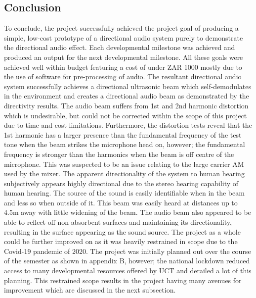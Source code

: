 \subsection{Conclusion}
To conclude, the project successfully achieved the project goal of producing a simple, low-cost prototype of a directional audio system purely to demonstrate the directional audio effect. Each developmental milestone was achieved and produced an output for the next developmental milestone. All these goals were achieved well within budget featuring a cost of under ZAR 1000 mostly due to the use of software for pre-processing of audio. The resultant directional audio system successfully achieves a directional ultrasonic beam which self-demodulates in the environment and creates a directional audio beam as demonstrated by the directivity results. The audio beam suffers from 1st and 2nd harmonic distortion which is undesirable, but could not be corrected within the scope of this project due to time and cost limitations. Furthermore, the distortion tests reveal that the 1st harmonic has a larger presence than the fundamental frequency of the test tone when the beam strikes the microphone head on, however; the fundamental frequency is stronger than the harmonics when the beam is off centre of the microphone. This was suspected to be an issue relating to the large carrier AM used by the mixer. The apparent directionality of the system to human hearing subjectively appears highly directional due to the stereo hearing capability of human hearing. The source of the sound is easily identifiable when in the beam and less so when outside of it. This beam was easily heard at distances up to 4.5m away with little widening of the beam. The audio beam also appeared to be able to reflect off non-absorbent surfaces and maintaining its directionality, resulting in the surface appearing as the sound source. The project as a whole could be further improved on as it was heavily restrained in scope due to the Covid-19 pandemic of 2020. The project was initially planned out over the course of the semester as shown in appendix B, however; the national lockdown reduced access to many developmental resources offered by UCT and derailed a lot of this planning. This restrained scope results in the project having many avenues for improvement which are discussed in the next subsection.

